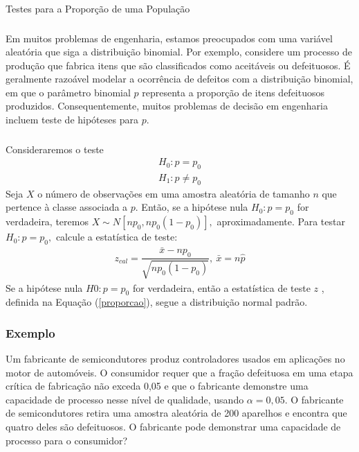 \documentclass[14pt,aspectratio=1610]{beamer}
\newcommand{\bx}{\ensuremath{\bar{x}}}
\newcommand{\Ho}{\ensuremath{H_{0}}}
\begin{document}
\begin{frame}{Testes para a Proporção de uma População}
\frametitle{}
\begin{block}{}
\justifying
Em muitos problemas de engenharia, estamos preocupados com uma variável aleatória que siga a distribuição binomial. Por exemplo, considere um processo de produção 
que fabrica itens que são classificados como aceitáveis ou defeituosos. É geralmente razoável modelar a ocorrência de defeitos com a distribuição binomial, em que o 
parâmetro binomial $p$ representa a proporção de itens defeituosos produzidos. Consequentemente, muitos problemas de decisão em engenharia incluem teste de 
hipóteses para $p.$
\end{block}
\end{frame}

\begin{frame}{}
\frametitle{}
\begin{block}{}
\justifying

Consideraremos o teste
\begin{align*}
H_{0}: p=p_{0}\\
H_{1}:p\neq p_{0}
\end{align*}
Seja $X$ o número de observações em uma amostra aleatória de tamanho $n$ que pertence 
à classe associada a $p.$ Então, se a hipótese nula $\Ho: p = p_{0}$ for verdadeira, teremos $X \sim N[np_{0}, np_{0}(1 - p_{0})],$ aproximadamente. Para testar 
$\Ho: p = p_{0},$ calcule a estatística de teste:
\begin{align}\label{proporcao}
z_{cal}=\dfrac{\bx-np_{0}}{\sqrt{np_{0}(1 - p_{0})}},\ \bx=n\hat{p}
\end{align}
Se a hipótese nula $H0:p=p_{0}$ for verdadeira, então a estatística de teste $z$ , definida na Equação (\ref{proporcao}), segue a distribuição normal padrão.
\end{block}
\end{frame}

\begin{frame}{}
\frametitle{Exemplo}
\begin{block}{}
\justifying
Um fabricante de semicondutores produz controladores usados em aplicações no motor de automóveis. O consumidor requer que a fração de\-fei\-tuo\-sa em uma etapa crítica de fabricação não exceda 0,05 e que o fabricante demonstre uma capacidade de processo nesse nível de qualidade, usando $\alpha = 0,05.$ O fabricante de 
semicondutores retira uma amostra aleatória de 200 aparelhos e encontra que quatro deles são defeituosos. O fabricante pode demonstrar uma capacidade de processo 
para o consumidor?
\end{block}
\end{frame}
\end{document}
